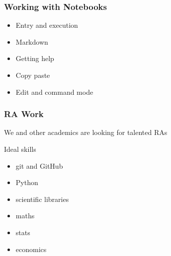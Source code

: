\documentclass[
    xcolor={svgnames,dvipsnames},
    hyperref={colorlinks, citecolor=DeepPink4, linkcolor=DarkRed, urlcolor=DarkBlue}
    ]{beamer}  %
\newcommand{\1}{\mathbbm 1}
\begin{document}
\begin{frame}
    \frametitle{Working with Notebooks}

    \begin{itemize}
        \item Entry and execution
    \vspace{1em}
        \item Markdown
    \vspace{1em}
        \item Getting help
    \vspace{1em}
        \item Copy paste
    \vspace{1em}
        \item Edit and command mode
    \end{itemize}

\end{frame}



\begin{frame}
    \frametitle{RA Work}

    We and other academics are looking for talented RAs

            \vspace{0.5em}
    Ideal skills

    \begin{itemize}
        \item git and GitHub
            \vspace{0.5em}
        \item Python
            \vspace{0.5em}
        \item scientific libraries
            \vspace{0.5em}
        \item maths
            \vspace{0.5em}
        \item stats
            \vspace{0.5em}
        \item economics
    \end{itemize}

\end{frame}
\end{document}
